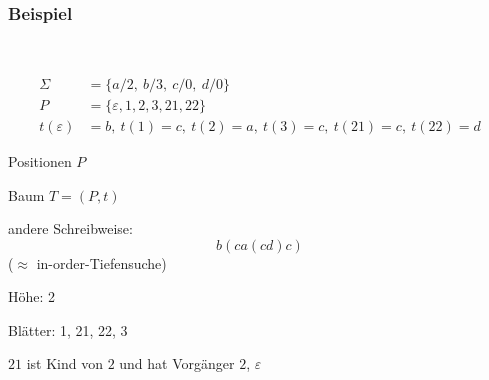     \begin{frame}
      \label{frame:baumbeispiel}
      \frametitle{Beispiel}
      ~\par\vspace*{-2\baselineskip}
      \begin{align*}
        \Sigma &= \{a/2,~ b/3,~ c/0,~ d/0\} \\
        P      &= \{\varepsilon, 1,2,3,21,22\} \\[4mm]
        t(\varepsilon) &= b,~ t(1) = c,~ t(2) = a,~ t(3) = c,~ t(21) = c,~ t(22) = d
      \end{align*}

      \par\smallskip
      \begin{center}
        \parbox{.20\textwidth}{%
          \begin{small}
            \strut Positionen $P$
            \par\smallskip
          \end{small}
        }%
        \quad
        \parbox{.24\textwidth}{%
          \begin{small}
            \strut Baum $T=(P,t)$
            \par\smallskip
          \end{small}
        }%
        \qquad
        \parbox{.36\textwidth}{%
          \begin{small}
            andere Schreibweise:\\
            \[
              b(ca(cd)c)
            \]
            ($\approx$ in-order-Tiefensuche)
          \end{small}%
        }
      \end{center}

      \begin{Itemize}
        \item
          Höhe: 2
        \item
          Blätter: 1, 21, 22, 3
        \item
          $21$ ist Kind von $2$ und hat Vorgänger $2$, $\varepsilon$
      \end{Itemize}


    \end{frame}

